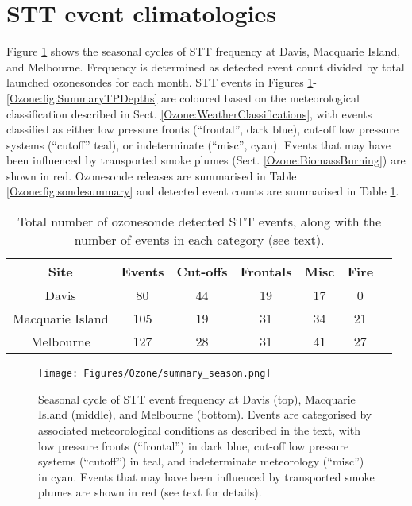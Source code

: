 \section{STT event climatologies}
  \label{Ozone:eventclimatologies}
  Figure \ref{Ozone:fig:SummarySeasonality} shows the seasonal cycles of STT frequency at Davis, Macquarie Island, and Melbourne.
  Frequency is determined as detected event count divided by total launched ozonesondes for each month.
  STT events in Figures \ref{Ozone:fig:SummarySeasonality}-\ref{Ozone:fig:SummaryTPDepths} are coloured based on the meteorological classification described in Sect. \ref{Ozone:WeatherClassifications}, with events classified as either low pressure fronts (``frontal'', dark blue), cut-off low pressure systems (``cutoff'' teal), or indeterminate (``misc'', cyan).
  Events that may have been influenced by transported smoke plumes (Sect. \ref{Ozone:BiomassBurning}) are shown in red.
  Ozonesonde releases are summarised in Table \ref{Ozone:fig:sondesummary} and detected event counts are summarised in Table \ref{Ozone:fig:EventCounts}.
  \begin{table}[t]
    \caption{Total number of ozonesonde detected STT events, along with the number of events in each category (see text).}
    \begin{tabular}{ c   c   c   c   c   c   c } 
      \hline
      Site & Events & Cut-offs & Frontals & Misc & Fire \\
      \hline
      Davis       	& 80 & 44  & 19 & 17 & 0 \\ 
      Macquarie Island 	& 105 & 19 & 31 & 34  & 21 \\
      Melbourne 	& 127 & 28 & 31 & 41 & 27 \\
      \hline
    \end{tabular}
    \label{Ozone:fig:EventCounts}
  \end{table}
  
  \begin{figure}[t]
    \texttt{[image: Figures/Ozone/summary\_season.png]}
    \caption{Seasonal cycle of STT event frequency at Davis (top), Macquarie Island (middle), and Melbourne (bottom).
      Events are categorised by associated meteorological conditions as described in the text, with low pressure fronts (``frontal'') in dark blue, cut-off low pressure systems (``cutoff'') in teal, and indeterminate meteorology (``misc'') in cyan. 
      Events that may have been influenced by transported smoke plumes are shown in red (see text for details).}
    \label{Ozone:fig:SummarySeasonality}
  \end{figure}
  

